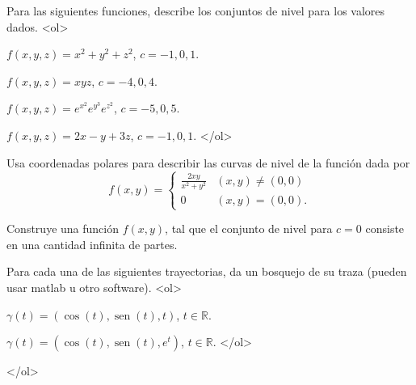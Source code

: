 \documentclass{article}
\theoremstyle{definition}
\newcommand{\sen}{\operatorname{sen}}
\begin{document}
	\item Para las siguientes funciones, describe los conjuntos de nivel para los valores dados.
	<ol>
	\item $f(x,y,z)=x^2+y^2+z^2$, $c=-1,0,1$.
	\item $f(x,y,z)=xyz$, $c=-4,0,4$.
	\item $f(x,y,z)=e^{x^2}e^{y^3}e^{z^2}$, $c=-5,0,5$.
	\item $f(x,y,z)=2x-y+3z$, $c=-1,0,1$.
	</ol>
	
	
	\item Usa coordenadas polares para describir las curvas de nivel de la función dada por
	$$
	f(x,y)=\left\{
	\begin{array}{cc}
	\frac{2xy}{x^2+y^2} & (x,y)\ne (0,0)\\
	0 & (x,y)=(0,0).
	\end{array}
	\right.
	$$
	
	
	\item Construye una función $f(x,y)$, tal que el conjunto de nivel para $c=0$ consiste en una cantidad infinita
	de partes.
	
	\item Para cada una de las siguientes trayectorias, da un bosquejo de su traza (pueden usar matlab u otro software).
	<ol>
	\item $\gamma(t)=(\cos(t), \sen(t), t)$, $t\in \mathbb{R}$.
	\item $\gamma(t)=(\cos(t), \sen(t), e^t)$, $t\in \mathbb{R}$.
	</ol>
	


</ol>
  
       
\end{document}
